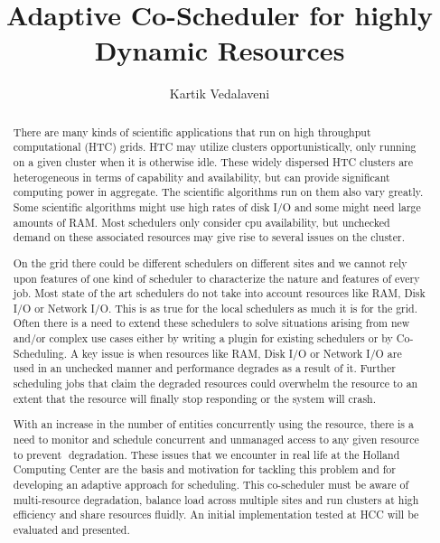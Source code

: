 \documentclass[ms,electronic,double]{nuthesis}
\begin{document}
\frontmatter
\title{Adaptive Co-Scheduler for highly Dynamic Resources}
\author{Kartik Vedalaveni}
\maketitle

\begin{abstract}
 There are many kinds of scientific applications that run on high throughput computational (HTC) 
grids. HTC may utilize clusters opportunistically, only running on a given cluster 
when it is otherwise idle. These widely dispersed HTC clusters are heterogeneous in terms of 
capability and availability, but can provide significant computing power in aggregate. The scientific 
algorithms run on them also vary greatly. Some scientific algorithms might use high rates of disk I/O 
and some might need large amounts of RAM. Most schedulers only consider cpu availability, but 
unchecked demand on these associated resources may give rise to several issues on the cluster.

On the grid there could be different schedulers on different sites and we cannot rely upon features 
of one kind of scheduler to characterize the nature and features of every job. Most state of the art 
schedulers do not take into account resources like RAM, Disk I/O or Network I/O. This is as true for the
 local schedulers as much it is for the grid. Often there is a need to extend these schedulers to solve 
 situations arising from new and/or complex use cases either by writing a plugin for existing schedulers or by Co­Scheduling. 
 A key issue is when resources like RAM, Disk I/O or Network I/O are used in an unchecked manner and 
 performance degrades as a result of it. Further scheduling jobs that claim the degraded resources could 
 overwhelm the resource to an extent that the resource will finally stop responding or the system will crash. 

With an increase in the number of entities concurrently using the resource, there is a need to monitor and schedule concurrent and unmanaged access to any given resource to prevent  degradation. These issues that we encounter in real life at the Holland Computing Center 
are the basis and motivation for tackling this problem and for developing an adaptive approach for scheduling. 
This co-scheduler must be aware of multi­-resource degradation, balance load across multiple sites and 
run clusters at high efficiency and share resources fluidly. An initial implementation tested at HCC will 
be evaluated and presented. 

  
\end{abstract}
\end{document}
